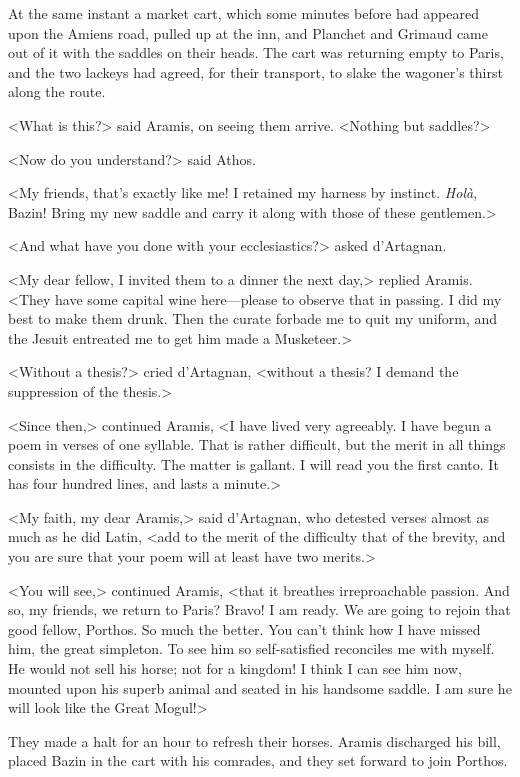 At the same instant a market cart, which some minutes before had appeared upon the Amiens road, pulled up at the inn, and Planchet and Grimaud came out of it with the saddles on their heads. The cart was returning empty to Paris, and the two lackeys had agreed, for their transport, to slake the wagoner's thirst along the route. 

<What is this?> said Aramis, on seeing them arrive. <Nothing but saddles?> 

<Now do you understand?> said Athos. 

<My friends, that's exactly like me! I retained my harness by instinct. \textit{Holà}, Bazin! Bring my new saddle and carry it along with those of these gentlemen.> 

<And what have you done with your ecclesiastics?> asked d'Artagnan. 

<My dear fellow, I invited them to a dinner the next day,> replied Aramis. <They have some capital wine here---please to observe that in passing. I did my best to make them drunk. Then the curate forbade me to quit my uniform, and the Jesuit entreated me to get him made a Musketeer.> 

<Without a thesis?> cried d'Artagnan, <without a thesis? I demand the suppression of the thesis.> 

<Since then,> continued Aramis, <I have lived very agreeably. I have begun a poem in verses of one syllable. That is rather difficult, but the merit in all things consists in the difficulty. The matter is gallant. I will read you the first canto. It has four hundred lines, and lasts a minute.> 

<My faith, my dear Aramis,> said d'Artagnan, who detested verses almost as much as he did Latin, <add to the merit of the difficulty that of the brevity, and you are sure that your poem will at least have two merits.> 

<You will see,> continued Aramis, <that it breathes irreproachable passion. And so, my friends, we return to Paris? Bravo! I am ready. We are going to rejoin that good fellow, Porthos. So much the better. You can't think how I have missed him, the great simpleton. To see him so self-satisfied reconciles me with myself. He would not sell his horse; not for a kingdom! I think I can see him now, mounted upon his superb animal and seated in his handsome saddle. I am sure he will look like the Great Mogul!> 

They made a halt for an hour to refresh their horses. Aramis discharged his bill, placed Bazin in the cart with his comrades, and they set forward to join Porthos. 

